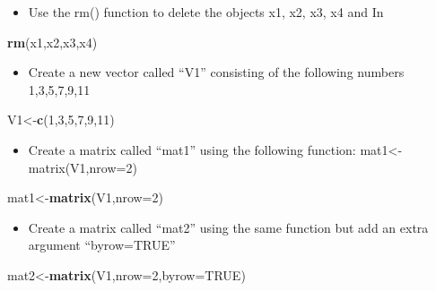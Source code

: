 \documentclass[
]{book}
\newenvironment{Shaded}{\begin{snugshade}}{\end{snugshade}}
\newcommand{\DataTypeTok}[1]{\textcolor[rgb]{0.13,0.29,0.53}{#1}}
\newcommand{\DecValTok}[1]{\textcolor[rgb]{0.00,0.00,0.81}{#1}}
\newcommand{\KeywordTok}[1]{\textcolor[rgb]{0.13,0.29,0.53}{\textbf{#1}}}
\newcommand{\NormalTok}[1]{#1}
\newcommand{\OtherTok}[1]{\textcolor[rgb]{0.56,0.35,0.01}{#1}}
\providecommand{\tightlist}{%
  \setlength{\itemsep}{0pt}\setlength{\parskip}{0pt}}
\begin{document}
\begin{itemize}
\tightlist
\item
  Use the rm() function to delete the objects x1, x2, x3, x4 and In
\end{itemize}

\begin{Shaded}
\begin{Highlighting}[]
\KeywordTok{rm}\NormalTok{(x1,x2,x3,x4)}
\end{Highlighting}
\end{Shaded}

\begin{itemize}
\tightlist
\item
  Create a new vector called ``V1'' consisting of the following numbers 1,3,5,7,9,11
\end{itemize}

\begin{Shaded}
\begin{Highlighting}[]
\NormalTok{V1<-}\KeywordTok{c}\NormalTok{(}\DecValTok{1}\NormalTok{,}\DecValTok{3}\NormalTok{,}\DecValTok{5}\NormalTok{,}\DecValTok{7}\NormalTok{,}\DecValTok{9}\NormalTok{,}\DecValTok{11}\NormalTok{)}
\end{Highlighting}
\end{Shaded}

\begin{itemize}
\tightlist
\item
  Create a matrix called ``mat1'' using the following function: mat1\textless-matrix(V1,nrow=2)
\end{itemize}

\begin{Shaded}
\begin{Highlighting}[]
\NormalTok{mat1<-}\KeywordTok{matrix}\NormalTok{(V1,}\DataTypeTok{nrow=}\DecValTok{2}\NormalTok{)}
\end{Highlighting}
\end{Shaded}

\begin{itemize}
\tightlist
\item
  Create a matrix called ``mat2'' using the same function but add an extra argument ``byrow=TRUE''
\end{itemize}

\begin{Shaded}
\begin{Highlighting}[]
\NormalTok{mat2<-}\KeywordTok{matrix}\NormalTok{(V1,}\DataTypeTok{nrow=}\DecValTok{2}\NormalTok{,}\DataTypeTok{byrow=}\OtherTok{TRUE}\NormalTok{)}
\end{Highlighting}
\end{Shaded}
\end{document}

